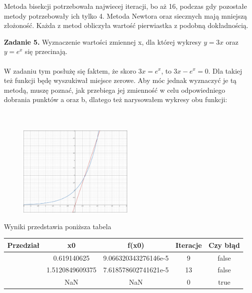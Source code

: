 \documentclass[15pt, a4paper]{article}
\begin{document}
\noindent Metoda bisekcji potrzebowała najwiecej iteracji, bo aż 16, podczas gdy pozostałe metody potrzebowały ich tylko 4. Metoda Newtora oraz siecznych mają mniejszą złożoność. Każda z metod obliczyła wartość pierwiastka z podobną dokładnością.

\vspace{0.5cm}

\noindent\hrulefill

\vspace{0.5cm}


\noindent\textbf{Zadanie 5.} Wyznaczenie wartości zmiennej x, dla której wykresy \( y = 3x \) oraz \( y = e^x \) się przecinają.\\\\
\noindent W zadaniu tym posłużę się faktem, że skoro \(3x = e^x \), to \(3x - e^x = 0 \). Dla takiej też funkcji będę wyszukiwał miejsce zerowe. Aby móc jednak wyznaczyć je tą metodą, muszę poznać, jak przebiega jej zmienność w celu odpowiedniego dobrania punktów a oraz b, dlatego też narysowałem wykresy obu funkcji:\\\\\

\begin{figure}[h]
    \centering
    \includegraphics[width=0.5\textwidth]{img/wykreszad5.png}
\end{figure}

\noindent Wyniki przedstawia poniższa tabela

\begin{table}[ht]
\begin{adjustbox}{max width=\textwidth}
\begin{tabular}{|c|c|c|c|c|}
    \hline
    \textbf{Przedział} & \textbf{x0} & \textbf{f(x0)} & \textbf{Iteracje} & \textbf{Czy błąd} \\
    \hline
    [0.0, 1.0] & 0.619140625 & 9.066320343276146e-5 & 9 & false \\
    \hline
    [1.0, 2.0] & 1.5120849609375 & 7.618578602741621e-5 & 13 & false \\
    \hline
    [0.0, 2.0] & NaN & NaN & 0 & true \\
    \hline
\end{tabular}
\end{adjustbox}
\end{table}
\end{document}
